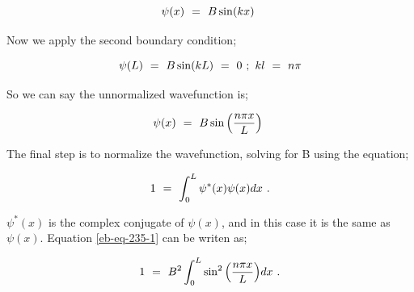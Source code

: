 \documentclass{article}
\begin{document}
\begin{equation} \label{eb-eq-232-1}
\psi(x) \hspace{0.125cm} = \hspace{0.125cm} B\sin(kx) \hspace{0.125cm}
\end{equation}

Now we apply the second boundary condition;

\begin{equation} \label{eb-eq-233-1}
\psi(L) \hspace{0.125cm} = \hspace{0.125cm} B\sin(kL) \hspace{0.125cm} = \hspace{0.125cm} 0 \hspace{0.125cm} ; \hspace{0.125cm} kl \hspace{0.125cm} = \hspace{0.125cm} n\pi 
\end{equation}

So we can say the unnormalized wavefunction is;

\begin{equation} \label{eb-eq-234-1}
\psi(x) \hspace{0.125cm} = \hspace{0.125cm} B\sin\Big(\frac{n\pi x}{L}\Big) \hspace{0.125cm}
\end{equation}

The final step is to normalize the wavefunction, solving for B using the equation; 

\begin{equation} \label{eb-eq-235-1}
1 \hspace{0.125cm} = \hspace{0.125cm} \int_{0}^{L} \psi^{\ast}(x)\psi(x) dx \hspace{0.125cm} .
\end{equation}

\begin{math} \psi^{\ast}(x) \end{math} is the complex conjugate of \begin{math} \psi(x) \end{math}, and in this case it is the same as \begin{math} \psi(x) \end{math}. Equation \ref{eb-eq-235-1} can be writen as; 

\begin{equation} \label{eb-eq-236-1}
1 \hspace{0.125cm} = \hspace{0.125cm} B^2 \int_{0}^{L} \sin^{2}\Big(\frac{n\pi x}{L}\Big) dx \hspace{0.125cm} .  
\end{equation}
\end{document}
